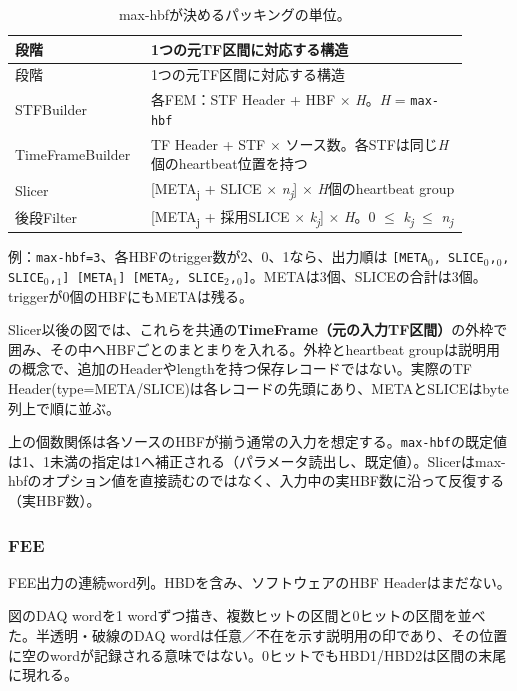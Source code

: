 \FloatBarrier
{\footnotesize\setlength{\tabcolsep}{3pt}\begin{longtable}{p{0.24\linewidth}p{0.66\linewidth}}
\caption{max-hbfが決めるパッキングの単位。}\label{tab:format-html-1}\\
\hline
段階 & 1つの元TF区間に対応する構造 \\ \hline\endfirsthead
\hline 段階 & 1つの元TF区間に対応する構造 \\ \hline\endhead
{STFBuilder} & {各FEM：STF Header + HBF $\times$ \textit{H}。\textit{H} = \texttt{max-hbf}} \\
{TimeFrameBuilder} & {TF Header + STF $\times$ ソース数。各STFは同じ\textit{H}個のheartbeat位置を持つ} \\
{Slicer} & {[META\textsubscript{j} + SLICE $\times$ \textit{n\textsubscript{j}}] $\times$ \textit{H}個のheartbeat group} \\
{後段Filter} & {[META\textsubscript{j} + 採用SLICE $\times$ \textit{k\textsubscript{j}}] $\times$ \textit{H}。0 $\leq$ \textit{k\textsubscript{j}} $\leq$ \textit{n\textsubscript{j}}} \\
\hline\end{longtable}}
例：\texttt{max-hbf=3}、各HBFのtrigger数が2、0、1なら、出力順は \texttt{[META$_0$, SLICE$_0$,$_0$, SLICE$_0$,$_1$] [META$_1$] [META$_2$, SLICE$_2$,$_0$]}。METAは3個、SLICEの合計は3個。triggerが0個のHBFにもMETAは残る。

Slicer以後の図では、これらを共通の\textbf{TimeFrame（元の入力TF区間）}の外枠で囲み、その中へHBFごとのまとまりを入れる。外枠とheartbeat groupは説明用の概念で、追加のHeaderやlengthを持つ保存レコードではない。実際のTF Header(type=META/SLICE)は各レコードの先頭にあり、METAとSLICEはbyte列上で順に並ぶ。

上の個数関係は各ソースのHBFが揃う通常の入力を想定する。\texttt{max-hbf}の既定値は1、1未満の指定は1へ補正される（パラメータ読出し、既定値）。Slicerはmax-hbfのオプション値を直接読むのではなく、入力中の実HBF数に沿って反復する（実HBF数）。


\subsubsection{FEE}
FEE出力の連続word列。HBDを含み、ソフトウェアのHBF Headerはまだない。

図のDAQ wordを1 wordずつ描き、複数ヒットの区間と0ヒットの区間を並べた。半透明・破線のDAQ wordは任意／不在を示す説明用の印であり、その位置に空のwordが記録される意味ではない。0ヒットでもHBD1/HBD2は区間の末尾に現れる。

